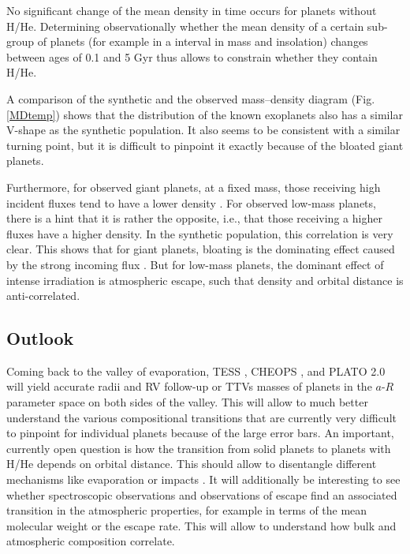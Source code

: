\documentclass[]{emulateapj}
\begin{document}
No significant change of the mean density in time occurs for planets without H/He. Determining observationally whether the mean density of a certain sub-group of planets (for example in a interval in mass and insolation) changes between ages of 0.1 and 5 Gyr thus allows to constrain whether they contain H/He. 

A comparison of the synthetic and the observed mass--density diagram (Fig. \ref{MDtemp})  shows that the distribution of the known exoplanets also has a similar V-shape as the synthetic population. It also seems to be consistent with a similar turning point, but it is difficult to pinpoint it exactly because of the bloated giant planets. 

Furthermore, for observed giant planets, at a fixed mass, those receiving high incident fluxes tend to have a lower density {\citep[e.g.,][]{Laughlin2011}}.  For observed low-mass planets, there is a hint that it is rather the opposite, i.e., that those receiving a higher fluxes have a higher density. In the synthetic population, this correlation is very clear. This shows that for giant planets, bloating is the dominating effect caused by the strong incoming flux {\citep[e.g.,][]{Thorngren2017}}. But for low-mass planets, the dominant effect of intense irradiation is atmospheric escape,   such that density and orbital distance is anti-correlated. 

\subsection{{Outlook}}
Coming back to the valley of evaporation, TESS \citep{Ricker2010}, CHEOPS \citep{Broeg2013}, and PLATO 2.0 {\citep{Rauer2013}} will yield accurate radii and RV follow-up or TTVs masses of planets in the $a$-$R$ parameter space on both sides of the  valley. This will allow to much better understand the various compositional transitions that are currently very difficult to pinpoint for individual planets because of the large error bars. An important, currently open question is how the transition from solid planets to planets with H/He depends on orbital distance. This should allow to disentangle different mechanisms like evaporation or impacts \citep{LopezRice2016}. It will additionally be interesting to see whether spectroscopic observations {and observations of escape} find an associated transition in the atmospheric properties, for example in terms of the mean molecular weight {or the escape rate}. This will allow to understand how bulk and atmospheric composition correlate.
\end{document}
